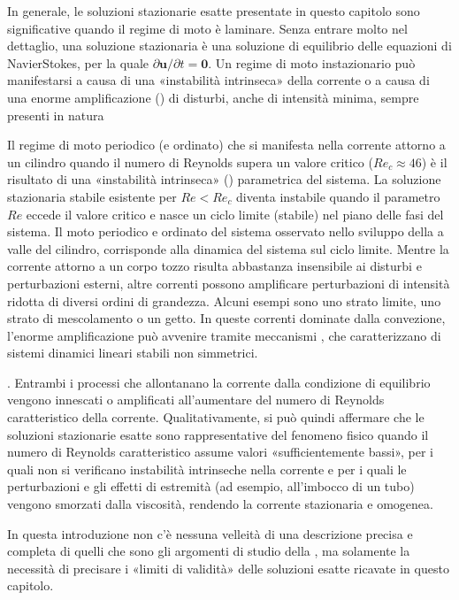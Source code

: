 \documentclass[letterpaper,10pt,italian]{jupyterBook}
\begin{document}
\sphinxAtStartPar
In generale, le soluzioni stazionarie esatte presentate in questo
capitolo sono significative quando il regime di moto è laminare. Senza
entrare molto nel dettaglio, una soluzione stazionaria è una soluzione
di equilibrio delle equazioni di Navier\sphinxhyphen{}Stokes, per la quale
\(\partial \mathbf{u}/\partial t = \mathbf{0}\). Un regime di moto instazionario
può manifestarsi a causa di una «instabilità intrinseca» della corrente
o a causa di una enorme amplificazione () di disturbi,
anche di intensità minima, sempre presenti in natura%
\begin{footnote}[1]\sphinxAtStartFootnote
Il regime di moto periodico (e ordinato) che si manifesta nella
corrente attorno a un cilindro quando il numero di Reynolds supera
un valore critico (\(Re_c \approx 46\)) è il risultato di una
«instabilità intrinseca» () parametrica del sistema. La
soluzione stazionaria stabile esistente per \(Re < Re_c\) diventa
instabile quando il parametro \(Re\) eccede il valore critico e nasce
un ciclo limite (stabile) nel piano delle fasi del sistema. Il moto
periodico e ordinato del sistema osservato nello sviluppo della
 a valle del cilindro, corrisponde alla dinamica
del sistema sul ciclo limite. Mentre la corrente attorno a un corpo
tozzo risulta abbastanza insensibile ai disturbi e perturbazioni
esterni, altre correnti possono amplificare perturbazioni di
intensità ridotta di diversi ordini di grandezza. Alcuni esempi sono
uno strato limite, uno strato di mescolamento o un getto. In queste
correnti dominate dalla convezione, l’enorme amplificazione può
avvenire tramite meccanismi , che caratterizzano di
sistemi dinamici lineari stabili non simmetrici.
%
\end{footnote}. Entrambi i
processi che allontanano la corrente dalla condizione di equilibrio
vengono innescati o amplificati all’aumentare del numero di Reynolds
caratteristico della corrente. Qualitativamente, si può quindi affermare
che le soluzioni stazionarie esatte sono rappresentative del fenomeno
fisico quando il numero di Reynolds caratteristico assume valori
«sufficientemente bassi», per i quali non si verificano instabilità
intrinseche nella corrente e per i quali le perturbazioni e gli effetti
di estremità (ad esempio, all’imbocco di un tubo) vengono smorzati dalla
viscosità, rendendo la corrente stazionaria e omogenea.

\sphinxAtStartPar
In questa introduzione non c’è nessuna velleità di una descrizione
precisa e completa di quelli che sono gli argomenti di studio della
, ma solamente la necessità di precisare i
«limiti di validità» delle soluzioni esatte ricavate in questo capitolo.
\end{document}
